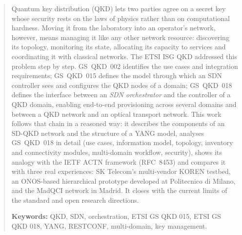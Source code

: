 \begin{abstract}
\noindent
Quantum key distribution (QKD) lets two parties agree on a secret key whose
security rests on the laws of physics rather than on computational
hardness. Moving it from the laboratory into an operator's network,
however, means managing it like any other network resource: discovering its
topology, monitoring its state, allocating its capacity to services and
coordinating it with classical networks. The ETSI ISG QKD addressed this
problem step by step. GS~QKD~002 identifies the use cases and integration
requirements; GS~QKD~015 defines the model through which an SDN controller
sees and configures the QKD nodes of a domain; GS~QKD~018 defines the
interface between an \emph{SDN orchestrator} and the controller of a QKD
domain, enabling end-to-end provisioning across several domains and
between a QKD network and an optical transport network. This work follows
that chain in a reasoned way: it describes the components of an SD-QKD
network and the structure of a YANG model, analyses GS~QKD~018 in detail
(use cases, information model, topology, inventory and connectivity
modules, multi-domain workflow, security), shows its analogy with the IETF
ACTN framework (RFC~8453) and compares it with three real experiences: SK
Telecom's multi-vendor KOREN testbed, an ONOS-based hierarchical prototype
developed at Politecnico di Milano, and the MadQCI network in Madrid. It
closes with the current limits of the standard and open research
directions.

\medskip
\noindent\textbf{Keywords:} QKD, SDN, orchestration, ETSI GS QKD 015,
ETSI GS QKD 018, YANG, RESTCONF, multi-domain, key management.
\end{abstract}
